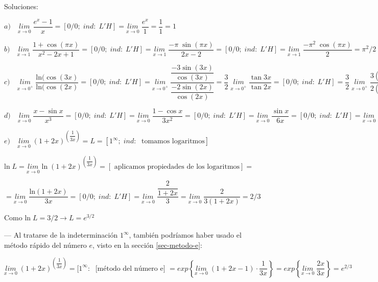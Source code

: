 	\begin{proofw}\renewcommand{\qedsymbol}{$\diamond$}	Soluciones:
	
	$a) \quad \underset {x \to 0 }{lim} \; {\dfrac {e^x-1} {x} } =[0/0; \; ind:\; L'H]=\underset {x \to 0 }{lim} \; {\dfrac {e^x} {1} }=\dfrac 1 1 = 1$	
	
	$b) \quad \underset {x\to 1 }{lim}\; {\dfrac {1+\cos (\pi x)}{x^2-2x+1} } = [0/0; \; ind:\; L'H] = \underset {x\to 1 }{lim}\; {\dfrac {-\pi\; \sin (\pi x)}{2x-2} }= [0/0; \; ind:\; L'H] =\underset {x\to 1 }{lim}\; {\dfrac {-{\pi}^2\; \cos (\pi x)}{2} }= {\pi}^2/2$
	
	$c) \quad \underset {x\to 0^+ }{lim} \; { \dfrac {\mathrm{ln} (\cos (3x)} {\mathrm{ln}  (\cos (2x)} } = [0/0; \; ind:\; L'H] = \underset {x \to 0^+ } {lim} \; { \dfrac {\dfrac {-3\sin (3x)} {\cos (3x)} } { \dfrac {-2\sin (2x)}  {\cos (2x)} } }  = \dfrac 3 2 \; \underset {x\to 0^+}{lim}\;{\dfrac {\tan 3x}{\tan 2x}} = [0/0; \; ind:\; L'H] = \dfrac 3 2 \; \underset {x\to 0^+}{lim}\;{\dfrac {3(1+3\tan^2 3x)}{2(1+2\tan^2 2x)}}=\dfrac 9 4$
	
	$d) \quad \underset {x\to 0} {lim} \; {\dfrac {x-\sin x}{x^3}}=[0/0; \; ind:\; L'H] =\underset {x\to 0} {lim} \; {\dfrac {1-\cos x}{3x^2}}=[0/0; \; ind:\; L'H] = \underset {x\to 0} {lim} \; {\dfrac {\sin x}{6x}}=[0/0; \; ind:\; L'H] = \underset {x\to 0} {lim} \; {\dfrac {\cos x}{6}}= \dfrac 1 6$
	
	$e) \quad \underset {x\to 0} {lim}\; { (1+2x) ^ {\left( \dfrac {1} {3x} \right) }} = L =[1^\infty ; \; ind: \; \mbox{ tomamos logaritmos} ]$
	
	$\mathrm{ln} \;  L=  \underset {x\to 0} {lim}\;   \mathrm{ln} \;  {(1+2x)} ^ { \left( \dfrac {1} {3x} \right) } =[\mbox { aplicamos propiedades de los logaritmos} ] =$
	
	$= \underset {x\to 0}{lim} \;{ \dfrac {\mathrm{ln} (1+2x)}{3x} } = [0/0; \; ind: \; L'H]= \underset {x\to 0}{lim} \;{ \dfrac {\dfrac {2}{1+2x}}{3} }= \underset {x \to 0}{lim} \; {\dfrac {2}{3(1+2x)}}=2/3$
	
	Como $\mathrm{ln} \;L=3/2\to L=e^{3/2}$
	
	--- Al tratarse de la indeterminación $1^\infty$, también podríamos haber usado el método rápido del número $e$, visto en la sección \ref{sec-metodo-e}:
	
	$\underset {x\to 0} {lim}\; { (1+2x) ^ {\left( \dfrac {1} {3x} \right) }}  =[1^\infty:\; \mbox{ [método del número e] }= exp \left\{ \underset {x\to 0}{lim}\; { (1+2x-1) \cdot \dfrac {1}{3x} }  \right\} = exp \left\{ \underset {x\to 0}{lim}\; {\dfrac {2x}{3x}} \right\} =e^{2/3}$
	

\end{proofw}
